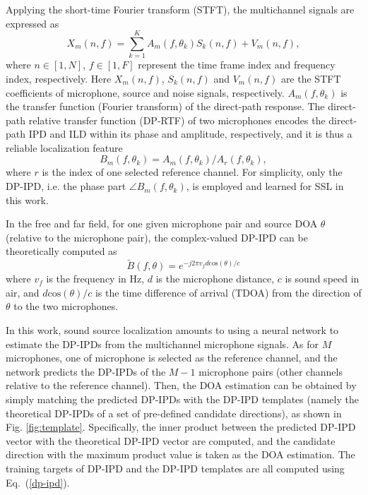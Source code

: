 \documentclass[lettersize,journal]{IEEEtran}
\begin{document}
Applying the short-time Fourier transform (STFT), the multichannel signals are expressed as 
\begin{equation}
X_m(n, f)=\sum_{k=1}^K A_m\left(f, \theta_k\right) S_k(n, f)+V_m(n, f),
\end{equation}
where $n \in[1, N]$, $f \in[1, F]$ represent the time frame index and frequency index, respectively. Here $X_m(n, f)$, $S_k(n, f)$ and $V_m(n, f)$ are the STFT coefficients of microphone, source and noise signals, respectively. $A_m\left(f, \theta_k\right)$ is the transfer function (Fourier transform) of the direct-path response. 
The direct-path relative transfer function (DP-RTF) of two microphones encodes the direct-path IPD and ILD within its phase and amplitude, respectively, and it is thus a reliable localization feature 
\begin{equation}
   B_m(f,\theta_k)={A_m(f, \theta_k)} / {A_r(f, \theta_k)},
\end{equation}
where $r$ is the index of one selected reference channel. For simplicity, only the DP-IPD, i.e. the phase part $\angle B_m(f,\theta_k)$, is employed and learned for SSL in this work.

In the free and far field, for one given microphone pair and source DOA $\theta$ (relative to the microphone pair), the complex-valued DP-IPD can be theoretically computed as 
\begin{equation}\label{dp-ipd}
 \tilde{B}(f,\theta) = e^{-j 2\pi v_f d \text{cos}(\theta)/c}
\end{equation}
where $v_f$ is the frequency in Hz, $d$ is the microphone distance, $c$ is sound speed in air, and $d\text{cos}(\theta)/c$ is the time difference of arrival (TDOA) from the direction of $\theta$ to the two microphones. 

In this work, sound source localization amounts to using a neural network to  estimate the DP-IPDs from the multichannel microphone signals.  As for $M$ microphones, one of microphone is selected as the reference channel, and the network predicts the DP-IPDs of the $M-1$ microphone pairs (other channels relative to the reference channel). Then, the DOA estimation can be obtained by simply matching the predicted DP-IPDs with the DP-IPD templates (namely the theoretical DP-IPDs of a set of pre-defined candidate directions), as shown in Fig. \ref{fig:template}. Specifically, the inner product between the predicted DP-IPD vector with the theoretical DP-IPD vector are computed, and the candidate direction with the maximum product value is taken as the DOA estimation. The training targets of DP-IPD and the DP-IPD templates are all computed using Eq.~(\ref{dp-ipd}). 
\end{document}
